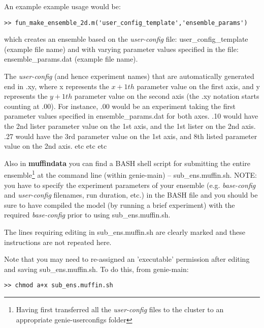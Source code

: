 \noindent An example example usage  would be:
\vspace{-1mm}\begin{verbatim}
>> fun_make_ensemble_2d.m('user_config_template','ensemble_params')
\end{verbatim}\vspace{-1mm}
which creates an ensemble based on the \textit{user-config} file: \textsf{\footnotesize user\_config\_template} (example file name) and with varying parameter values specified in the file: \textsf{\footnotesize ensemble\_params.dat} (example file name).

The \textit{user-config} (and hence experiment names) that are automatically generated end in \textsf{\footnotesize .xy}, where \textsf{\footnotesize x} represents the \(x+1th\) parameter value on the first axis, and \textsf{\footnotesize y} represents the \(y+1th\) parameter value on the second axis (the \textsf{\footnotesize .xy} notation starts counting at \textsf{\footnotesize .00}). For instance, \textsf{\footnotesize .00} would be an experiment taking the first parameter values specified in \textsf{\footnotesize ensemble\_params.dat} for both axes. \textsf{\footnotesize .10} would have the 2nd lister parameter value on the 1st axis, and the 1st lister on the 2nd axis. \textsf{\footnotesize .27} would have the 3rd parameter value on the 1st axis, and 8th listed parameter value on the 2nd axis. etc etc etc

Also in \textbf{muffindata} you can find a BASH shell script for submitting the entire ensemble\footnote{Having first transferred all the \textit{user-config} files to the cluster to an appropriate \textsf{\footnotesize genie-userconfigs} folder} at the command line (within \textsf{\footnotesize genie-main}) -- \textsf{\footnotesize sub\_ens.muffin.sh}. NOTE: you have to specify the experiment parameters of your ensemble (e.g. \textit{base-config} and \textit{user-config} filenames, run duration, etc.) in the BASH file and you should be sure to have compiled the model (by running a brief experiment) with the required \textit{base-config} prior to using \textsf{\footnotesize sub\_ens.muffin.sh}.

The lines requiring editing in \textsf{\footnotesize sub\_ens.muffin.sh} are clearly marked and these instructions are not repeated here.

\newpage 

Note that you may need to re-assigned an 'executable' permission after editing and saving \textsf{\footnotesize sub\_ens.muffin.sh}. To do this, from \textsf{\footnotesize genie-main}:
\vspace{-1mm}\begin{verbatim}
>> chmod a+x sub_ens.muffin.sh
\end{verbatim}\vspace{-1mm}

